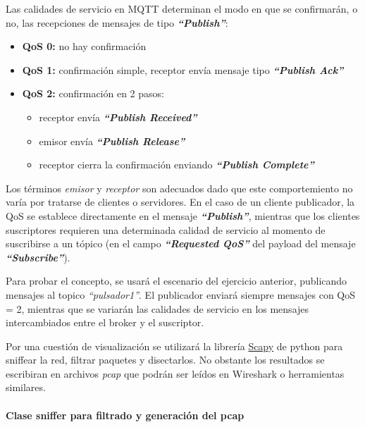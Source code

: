 \documentclass[11pt]{extarticle}
\begin{document}
Las calidades de servicio en MQTT determinan el modo en que se
confirmarán, o no, las recepciones de mensajes de tipo
\textbf{\emph{``Publish''}}:

\begin{itemize}
\item
  \textbf{QoS 0:} no hay confirmación
\item
  \textbf{QoS 1:} confirmación simple, receptor envía mensaje tipo
  \textbf{\emph{``Publish Ack''}}
\item
  \textbf{QoS 2:} confirmación en 2 pasos:

  \begin{itemize}
  \item
    receptor envía \textbf{\emph{``Publish Received''}}
  \item
    emisor envía \textbf{\emph{``Publish Release''}}
  \item
    receptor cierra la confirmación enviando \textbf{\emph{``Publish
    Complete''}}
  \end{itemize}
\end{itemize}

Los términos \emph{emisor} y \emph{receptor} son adecuados dado que este
comportemiento no varía por tratarse de clientes o servidores. En el
caso de un cliente publicador, la QoS se establece directamente en el
mensaje \textbf{\emph{``Publish''}}, mientras que los clientes
suscriptores requieren una determinada calidad de servicio al momento de
suscribirse a un tópico (en el campo \textbf{\emph{``Requested QoS''}}
del payload del mensaje \textbf{\emph{``Subscribe''}}).

Para probar el concepto, se usará el escenario del ejercicio anterior,
publicando mensajes al topico \emph{``pulsador1''}. El publicador
enviará siempre mensajes con QoS = 2, mientras que se variarán las
calidades de servicio en los mensajes intercambiados entre el broker y
el suscriptor.

Por una cuestión de visualización se utilizará la librería
\href{https://scapy.net/}{Scapy} de python para sniffear la red, filtrar
paquetes y disectarlos. No obstante los resultados se escribiran en
archivos \emph{pcap} que podrán ser leídos en Wireshark o herramientas
similares.

    \hypertarget{clase-sniffer-para-filtrado-y-generaciuxf3n-del-pcap}{%
\paragraph{Clase sniffer para filtrado y generación del
pcap}\label{clase-sniffer-para-filtrado-y-generaciuxf3n-del-pcap}}
\end{document}
